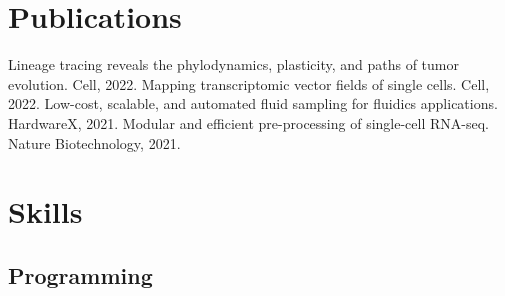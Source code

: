 \documentclass[]{resume}
\begin{document}
\begin{minipage}[t]{0.28\textwidth}


\section{Publications}
\renewcommand\refname{\vskip -1.5em} %
\begin{thebibliography}{9}
Lineage tracing reveals the phylodynamics, plasticity, and paths of tumor evolution. Cell, 2022.
Mapping transcriptomic vector fields of single cells. Cell, 2022.
Low-cost, scalable, and automated fluid sampling for fluidics applications. HardwareX, 2021.
Modular and efficient pre-processing of single-cell RNA-seq. Nature Biotechnology, 2021.
\end{thebibliography}

\section{Skills}
\subsection{Programming}
\\
\\
\\
\sectionsep


\end{minipage}
\end{document}
